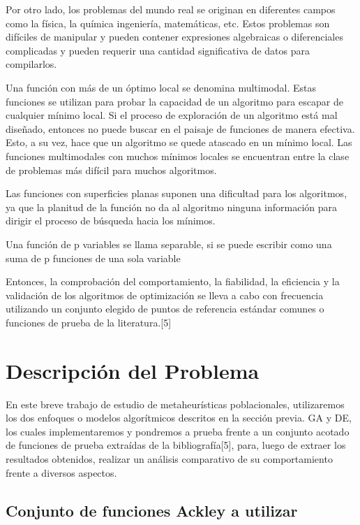 \documentclass[10pt]{article}
\begin{document}
Por otro lado, los problemas del mundo real se originan en diferentes campos como la física, la química ingeniería, matemáticas, etc. Estos problemas son difíciles de manipular y pueden contener expresiones algebraicas o diferenciales complicadas y pueden requerir una cantidad significativa de datos para compilarlos.

Una función con más de un óptimo local se denomina multimodal. Estas funciones se utilizan para probar la capacidad de un algoritmo para escapar de cualquier mínimo local. Si el proceso de exploración de un algoritmo está mal diseñado, entonces no puede buscar en el paisaje de funciones de manera efectiva. Esto, a su vez, hace que un algoritmo se quede atascado en un mínimo local. Las funciones multimodales con muchos mínimos locales se encuentran entre la clase de problemas más difícil para muchos algoritmos. 

Las funciones con superficies planas suponen una dificultad para los algoritmos, ya que la planitud de la función no da al algoritmo ninguna información para dirigir el proceso de búsqueda hacia los mínimos.

Una función de p variables se llama separable, si se puede escribir como una suma de p funciones de una sola variable

Entonces, la comprobación del comportamiento, la fiabilidad, la eficiencia y la validación de los algoritmos de optimización se lleva a cabo con frecuencia utilizando un conjunto elegido de puntos de referencia estándar comunes o funciones de prueba de la literatura.[5]

\section{Descripción del Problema}

En este breve trabajo de estudio de metaheurísticas poblacionales, utilizaremos los dos enfoques o modelos algorítmicos descritos en la sección previa. GA y DE, los cuales implementaremos y pondremos a prueba frente a un conjunto acotado de funciones de prueba extraídas de la bibliografía[5], para, luego de extraer los resultados obtenidos, realizar un análisis comparativo de su comportamiento frente a diversos aspectos.


\subsection{Conjunto de funciones Ackley a utilizar}
\end{document}
